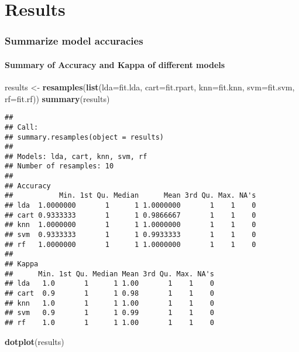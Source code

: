 \documentclass[]{article}
\newenvironment{Shaded}{\begin{snugshade}}{\end{snugshade}}
\newcommand{\KeywordTok}[1]{\textcolor[rgb]{0.13,0.29,0.53}{\textbf{#1}}}
\newcommand{\DataTypeTok}[1]{\textcolor[rgb]{0.13,0.29,0.53}{#1}}
\newcommand{\StringTok}[1]{\textcolor[rgb]{0.31,0.60,0.02}{#1}}
\newcommand{\NormalTok}[1]{#1}
\let\oldparagraph\paragraph
\renewcommand{\paragraph}[1]{\oldparagraph{#1}\mbox{}}
\begin{document}
\section{Results}\label{results}

\subsubsection{Summarize model
accuracies}\label{summarize-model-accuracies}

\paragraph{Summary of Accuracy and Kappa of different
models}\label{summary-of-accuracy-and-kappa-of-different-models}

\begin{Shaded}
\begin{Highlighting}[]
\NormalTok{results <-}\StringTok{ }\KeywordTok{resamples}\NormalTok{(}\KeywordTok{list}\NormalTok{(}\DataTypeTok{lda=}\NormalTok{fit.lda, }\DataTypeTok{cart=}\NormalTok{fit.rpart, }\DataTypeTok{knn=}\NormalTok{fit.knn, }\DataTypeTok{svm=}\NormalTok{fit.svm, }\DataTypeTok{rf=}\NormalTok{fit.rf))}
\KeywordTok{summary}\NormalTok{(results)}
\end{Highlighting}
\end{Shaded}

\begin{verbatim}
## 
## Call:
## summary.resamples(object = results)
## 
## Models: lda, cart, knn, svm, rf 
## Number of resamples: 10 
## 
## Accuracy 
##           Min. 1st Qu. Median      Mean 3rd Qu. Max. NA's
## lda  1.0000000       1      1 1.0000000       1    1    0
## cart 0.9333333       1      1 0.9866667       1    1    0
## knn  1.0000000       1      1 1.0000000       1    1    0
## svm  0.9333333       1      1 0.9933333       1    1    0
## rf   1.0000000       1      1 1.0000000       1    1    0
## 
## Kappa 
##      Min. 1st Qu. Median Mean 3rd Qu. Max. NA's
## lda   1.0       1      1 1.00       1    1    0
## cart  0.9       1      1 0.98       1    1    0
## knn   1.0       1      1 1.00       1    1    0
## svm   0.9       1      1 0.99       1    1    0
## rf    1.0       1      1 1.00       1    1    0
\end{verbatim}

\begin{Shaded}
\begin{Highlighting}[]
\KeywordTok{dotplot}\NormalTok{(results)}
\end{Highlighting}
\end{Shaded}
\end{document}
